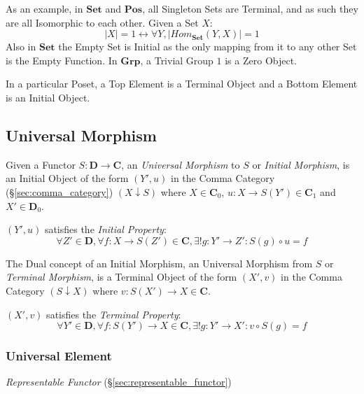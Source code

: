 As an example, in $\mathbf{Set}$ and $\mathbf{Pos}$, all Singleton
Sets are Terminal, and as such they are all Isomorphic to each other.
Given a Set $X$:
\[
    |X| = 1 \leftrightarrow \forall Y, |Hom_{\mathbf{Set}}(Y,X)| = 1
\]
Also in $\mathbf{Set}$ the Empty Set is Initial as the only mapping
from it to any other Set is the Empty Function. In $\mathbf{Grp}$, a
Trivial Group ${1}$ is a Zero Object.

In a particular Poset, a Top Element is a Terminal Object and a Bottom
Element is an Initial Object.



\subsection{Universal Morphism}\label{sec:universal_morphism}

Given a Functor $S: \mathbf{D} \rightarrow \mathbf{C}$, an
\emph{Universal Morphism} to $S$ or \emph{Initial Morphism}, is an
Initial Object of the form $(Y',u)$ in the Comma Category
(\S\ref{sec:comma_category}) $(X \downarrow S)$ where $X \in
\mathbf{C}_0$, $u : X \rightarrow S(Y') \in \mathbf{C}_1$ and $X' \in
\mathbf{D}_0$.

$(Y', u)$ satisfies the \emph{Initial Property}:
\[
    \forall Z' \in \mathbf{D}, \forall f : X \rightarrow S(Z') \in
    \mathbf{C}, \exists! g : Y' \rightarrow Z' : S(g) \circ u = f
\]

The Dual concept of an Initial Morphism, an Universal Morphism from
$S$ or \emph{Terminal Morphism}, is a Terminal Object of the form
$(X',v)$ in the Comma Category $(S \downarrow X)$ where $v : S(X')
\rightarrow X \in \mathbf{C}$.

$(X',v)$ satisfies the \emph{Terminal Property}:
\[
    \forall Y' \in \mathbf{D}, \forall f : S(Y') \rightarrow X \in
    \mathbf{C}, \exists! g : Y' \rightarrow X' : v \circ S(g) = f
\]




\subsubsection{Universal Element}\label{sec:universal_element}

\emph{Representable Functor} (\S\ref{sec:representable_functor})

